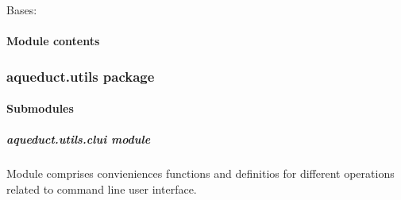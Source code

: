 \documentclass[a4paper,10pt,english]{sphinxmanual}
\begin{document}
\begin{fulllineitems}
\label{aqueduct.traj.selections:aqueduct.traj.selections.CompactSelectionMDA}
Bases: \href{http://docs.python.org/2/library/functions.html\#object}{}

\begin{fulllineitems}
\label{aqueduct.traj.selections:aqueduct.traj.selections.CompactSelectionMDA.__init__}
\end{fulllineitems}


\begin{fulllineitems}
\label{aqueduct.traj.selections:aqueduct.traj.selections.CompactSelectionMDA.toSelectionMDA}
\end{fulllineitems}


\end{fulllineitems}



\paragraph{Module contents}
\label{aqueduct.traj:module-aqueduct.traj}\label{aqueduct.traj:module-contents}

\subsubsection{aqueduct.utils package}
\label{aqueduct.utils:aqueduct-utils-package}\label{aqueduct.utils::doc}

\paragraph{Submodules}
\label{aqueduct.utils:submodules}

\subparagraph{aqueduct.utils.clui module}
\label{aqueduct.utils.clui::doc}\label{aqueduct.utils.clui:aqueduct-utils-clui-module}\label{aqueduct.utils.clui:module-aqueduct.utils.clui}
Module comprises convieniences functions and definitios for different operations related to command line user interface.
\end{document}

